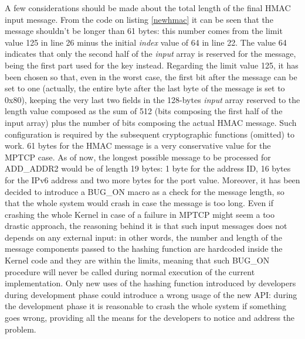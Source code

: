 A few considerations should be made about the total length of the final HMAC input message. From the code on listing \ref{newhmac} it can be seen that the message shouldn't be longer than 61 bytes: this number comes from the limit value 125 in line 26 minus the initial \textit{index} value of 64 in line 22. The value 64 indicates that only the second half of the \textit{input} array is reserved for the message, being the first part used for the key instead. Regarding the limit value 125, it has been chosen so that, even in the worst case, the first bit after the message can be set to one (actually, the entire byte after the last byte of the message is set to 0x80), keeping the very last two fields in the 128-bytes \textit{input} array reserved to the length value composed as the sum of 512 (bits composing the first half of the input array) plus the number of bits composing the actual HMAC message. Such configuration is required by the subsequent cryptographic functions (omitted) to work. 
61 bytes for the HMAC message is a very conservative value for the MPTCP case. As of now, the longest possible message to be processed for ADD\_ADDR2 would be of length 19 bytes: 1 byte for the address ID, 16 bytes for the IPv6 address and two more bytes for the port value.
Moreover, it has been decided to introduce a BUG\_ON macro as a check for the message length, so that the whole system would crash in case the message is too long. Even if crashing the whole Kernel in case of a failure in MPTCP might seem a too drastic approach, the reasoning behind it is that such input messages does not depends on any external input: in other words, the number and length of the message components passed to the hashing function are hardcoded inside the Kernel code and they are within the limits, meaning that such BUG\_ON procedure will never be called during normal execution of the current implementation. Only new uses of the hashing function introduced by developers during development phase could introduce a wrong usage of the new API: during the development phase it is reasonable to crash the whole system if something goes wrong, providing all the means for the developers to notice and address the problem.

